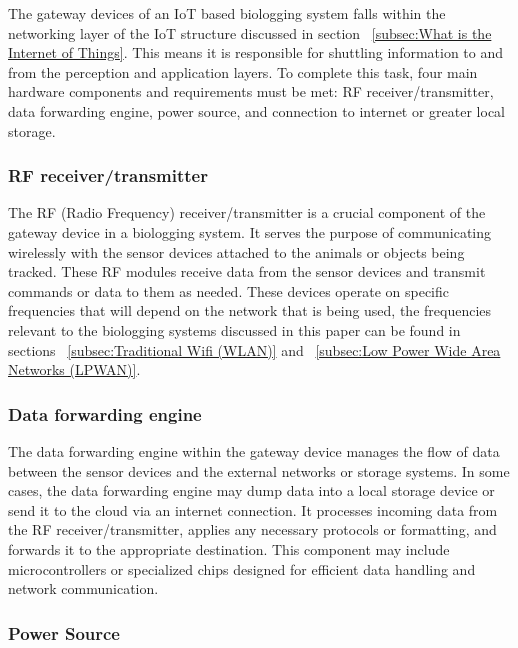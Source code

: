 \documentclass[sigplan,screen,nonacm]{acmart}
\begin{document}
The gateway devices of an IoT based biologging system falls within the networking layer of the IoT 
structure discussed in section ~\ref{subsec:What is the Internet of Things}. This means it is responsible 
for shuttling information to and from the perception and application layers. To complete this task, four main 
hardware components and requirements must be met: RF receiver/transmitter, data forwarding engine, power source, 
and connection to internet or greater local storage.

\subsubsection{RF receiver/transmitter}
\label{subsubsec:RF receiver/transmitter}

The RF (Radio Frequency) receiver/transmitter is a crucial component of the gateway device in a biologging system. 
It serves the purpose of communicating wirelessly with the sensor devices attached to the animals or objects being 
tracked. These RF modules receive data from the sensor devices and transmit commands or data to them as needed. 
These devices operate on specific frequencies that will depend on the network that is being used, the frequencies 
relevant to the biologging systems discussed in this paper can be found in sections ~\ref{subsec:Traditional Wifi 
(WLAN)} and ~\ref{subsec:Low Power Wide Area Networks (LPWAN)}.

\subsubsection{Data forwarding engine}
\label{subsubsec:Data forwarding engine}

The data forwarding engine within the gateway device manages the flow of data between the sensor devices and 
the external networks or storage systems. In some cases, the data forwarding engine may dump data into a local storage 
device or send it to the cloud via an internet connection. It processes incoming data from the RF receiver/transmitter, 
applies any necessary protocols or formatting, and forwards it to the appropriate destination. This component may include 
microcontrollers or specialized chips designed for efficient data handling and network communication.

\subsubsection{Power Source}
\label{subsubsec:Power Source}
\end{document}
